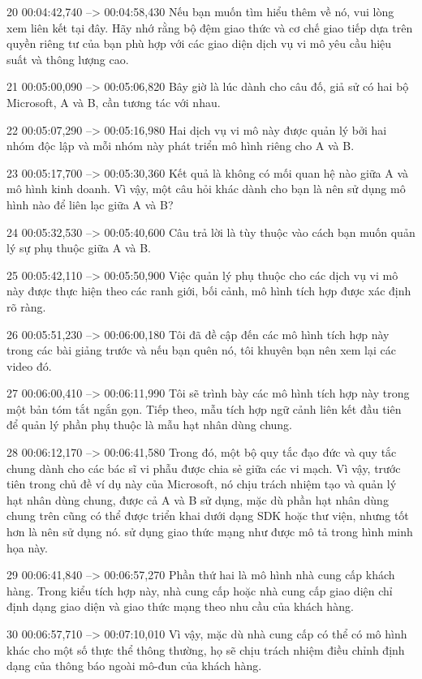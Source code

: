 20
00:04:42,740 --> 00:04:58,430
Nếu bạn muốn tìm hiểu thêm về nó, vui lòng xem liên kết tại đây.  Hãy nhớ rằng bộ đệm giao thức và cơ chế giao tiếp dựa trên quyền riêng tư của bạn phù hợp với các giao diện dịch vụ vi mô yêu cầu hiệu suất và thông lượng cao.

21
00:05:00,090 --> 00:05:06,820
Bây giờ là lúc dành cho câu đố, giả sử có hai bộ Microsoft, A và B, cần tương tác với nhau.

22
00:05:07,290 --> 00:05:16,980
Hai dịch vụ vi mô này được quản lý bởi hai nhóm độc lập và mỗi nhóm này phát triển mô hình riêng cho A và B.

23
00:05:17,700 --> 00:05:30,360
Kết quả là không có mối quan hệ nào giữa A và mô hình kinh doanh.  Vì vậy, một câu hỏi khác dành cho bạn là nên sử dụng mô hình nào để liên lạc giữa A và B?

24
00:05:32,530 --> 00:05:40,600
Câu trả lời là tùy thuộc vào cách bạn muốn quản lý sự phụ thuộc giữa A và B.

25
00:05:42,110 --> 00:05:50,900
Việc quản lý phụ thuộc cho các dịch vụ vi mô này được thực hiện theo các ranh giới, bối cảnh, mô hình tích hợp được xác định rõ ràng.

26
00:05:51,230 --> 00:06:00,180
Tôi đã đề cập đến các mô hình tích hợp này trong các bài giảng trước và nếu bạn quên nó, tôi khuyên bạn nên xem lại các video đó.

27
00:06:00,410 --> 00:06:11,990
Tôi sẽ trình bày các mô hình tích hợp này trong một bản tóm tắt ngắn gọn.  Tiếp theo, mẫu tích hợp ngữ cảnh liên kết đầu tiên để quản lý phần phụ thuộc là mẫu hạt nhân dùng chung.

28
00:06:12,170 --> 00:06:41,580
Trong đó, một bộ quy tắc đạo đức và quy tắc chung dành cho các bác sĩ vi phẫu được chia sẻ giữa các vi mạch.  Vì vậy, trước tiên trong chủ đề ví dụ này của Microsoft, nó chịu trách nhiệm tạo và quản lý hạt nhân dùng chung, được cả A và B sử dụng, mặc dù phần hạt nhân dùng chung trên cũng có thể được triển khai dưới dạng SDK hoặc thư viện, nhưng tốt hơn là nên sử dụng nó.  sử dụng giao thức mạng như được mô tả trong hình minh họa này.

29
00:06:41,840 --> 00:06:57,270
Phần thứ hai là mô hình nhà cung cấp khách hàng.  Trong kiểu tích hợp này, nhà cung cấp hoặc nhà cung cấp giao diện chỉ định dạng giao diện và giao thức mạng theo nhu cầu của khách hàng.

30
00:06:57,710 --> 00:07:10,010
Vì vậy, mặc dù nhà cung cấp có thể có mô hình khác cho một số thực thể thông thường, họ sẽ chịu trách nhiệm điều chỉnh định dạng của thông báo ngoài mô-đun của khách hàng.

